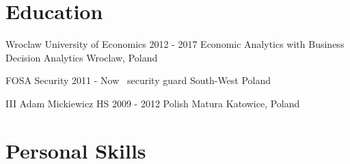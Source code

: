 \documentclass{tccv}
\begin{document}
\section{Education}

\begin{yearlist}


\item[Wroclaw University of Economics]
     {2012 - 2017}
     {Economic Analytics with Business Decision Analytics}
     {Wroclaw, Poland}

\item[FOSA Security]
     {2011 - Now\ }
     {security guard}
     {South-West Poland}

\item[III Adam Mickiewicz HS]
     {2009 - 2012}
     {Polish Matura}
     {Katowice, Poland}



\end{yearlist}

\section{Personal Skills}
\end{document}
